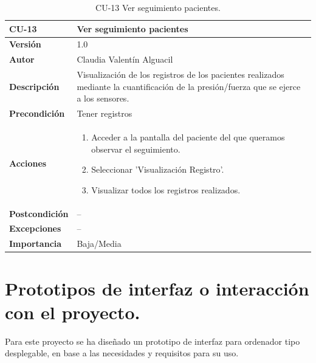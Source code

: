 \begin{table}[p]
	\centering
	\begin{tabularx}{\linewidth}{ p{} p{} }
		\toprule
		\textbf{CU-13}    & \textbf{Ver seguimiento pacientes}\\
		\toprule
		\textbf{Versión}              & 1.0    \\
		\textbf{Autor}                & Claudia Valentín Alguacil \\
		
		\textbf{Descripción}          & Visualización de los registros de los pacientes realizados mediante la cuantificación de la presión/fuerza que se ejerce a los sensores.\\
		\textbf{Precondición}         & Tener registros \\
		\textbf{Acciones}             &
		\begin{enumerate}
			\def\labelenumi{\arabic{enumi}.}
			\tightlist
			\item Acceder a la pantalla del paciente del que queramos observar el seguimiento.
			\item Seleccionar 'Visualización Registro'.
                \item Visualizar todos los registros realizados.
		\end{enumerate}\\
		\textbf{Postcondición}        &  -- \\
		\textbf{Excepciones}          & -- \\
		\textbf{Importancia}          & Baja/Media \\
		\bottomrule
	\end{tabularx}
	\caption{CU-13 Ver seguimiento pacientes.}
\end{table}


\newpage

\section{Prototipos de interfaz o interacción con el proyecto.}

Para este proyecto se ha diseñado un prototipo de interfaz para ordenador tipo desplegable, en base a las necesidades y requisitos para su uso. 

